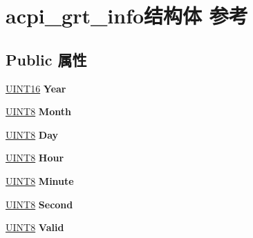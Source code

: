 \hypertarget{structacpi__grt__info}{}\section{acpi\+\_\+grt\+\_\+info结构体 参考}
\label{structacpi__grt__info}
\subsection*{Public 属性}
\begin{DoxyCompactItemize}
\item 
\mbox{\label{structacpi__grt__info_a2d20cdb4938d73c60162f93bcce6aa56}} 
\hyperlink{_processor_bind_8h_a09f1a1fb2293e33483cc8d44aefb1eb1}{U\+I\+N\+T16} {\bfseries Year}
\item 
\mbox{\label{structacpi__grt__info_ac4ecd6a3ca032b769352294dc57ae306}} 
\hyperlink{_processor_bind_8h_ab27e9918b538ce9d8ca692479b375b6a}{U\+I\+N\+T8} {\bfseries Month}
\item 
\mbox{\label{structacpi__grt__info_a90f553ee30412afc4b4887eb9121106f}} 
\hyperlink{_processor_bind_8h_ab27e9918b538ce9d8ca692479b375b6a}{U\+I\+N\+T8} {\bfseries Day}
\item 
\mbox{\label{structacpi__grt__info_a082809cdc08e6ed310e4d748b3ac59eb}} 
\hyperlink{_processor_bind_8h_ab27e9918b538ce9d8ca692479b375b6a}{U\+I\+N\+T8} {\bfseries Hour}
\item 
\mbox{\label{structacpi__grt__info_ace0cd38ab52d3c12ca32314908aa633e}} 
\hyperlink{_processor_bind_8h_ab27e9918b538ce9d8ca692479b375b6a}{U\+I\+N\+T8} {\bfseries Minute}
\item 
\mbox{\label{structacpi__grt__info_ac8779db57631f44c1613f09057b9b043}} 
\hyperlink{_processor_bind_8h_ab27e9918b538ce9d8ca692479b375b6a}{U\+I\+N\+T8} {\bfseries Second}
\item 
\mbox{\label{structacpi__grt__info_a7e2717b11b44cf55d20d52ac3533b127}} 
\hyperlink{_processor_bind_8h_ab27e9918b538ce9d8ca692479b375b6a}{U\+I\+N\+T8} {\bfseries Valid}
\item 

\end{DoxyCompactItemize}
